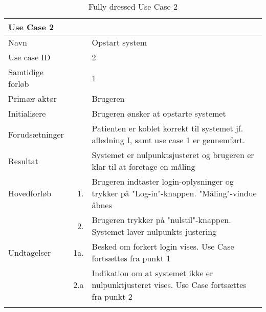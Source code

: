 \begin{longtabu} to  %
    {\large \textbf{Use Case 2}} && \\
    \toprule
    Navn &&    Opstart system\\
    Use case ID &&    2\\
    Samtidige forløb &&    1\\
    Primær aktør &&    Brugeren\\
    Initialisere &&    Brugeren ønsker at opstarte systemet\\
    Forudsætninger &&  Patienten er koblet korrekt til systemet jf. afledning I, samt use case 1 er gennemført.\\
    Resultat &&    Systemet er nulpunktsjusteret og brugeren er klar til at foretage en måling\\
    \midrule
    Hovedforløb &    1. &    Brugeren indtaster login-oplysninger og trykker på "Log-in"\--knappen. "Måling"\--vindue åbnes \\
    	&			2. & Brugeren trykker på "nulstil"\--knappen. Systemet laver nulpunkts justering  \\ \midrule
    Undtagelser &    1a. & Besked om forkert login vises. Use Case fortsættes fra punkt 1     \\ 
    	&			2.a & Indikation om at systemet ikke er nulpunktjusteret vises. Use Case fortsættes fra punkt 2 \\ \bottomrule    
\caption{Fully dressed Use Case 2}
\label{UC2}
\end{longtabu}



